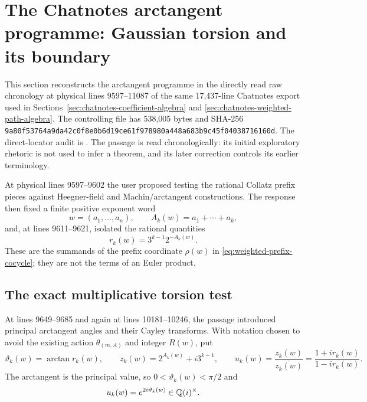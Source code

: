\section{The Chatnotes arctangent programme: Gaussian torsion and its boundary}
\label{sec:chatnotes-arctangent-torsion}

This section reconstructs the arctangent programme in the directly read raw
chronology at physical lines 9597--11087 of the same 17,437-line Chatnotes
export used in Sections~\ref{sec:chatnotes-coefficient-algebra} and
\ref{sec:chatnotes-weighted-path-algebra}.  The controlling file has 538,005
bytes and SHA-256
\nolinkurl{9a80f53764a9da42c0f8e0b6d19ce61f978980a448a683b9c45f04038716160d}.
The direct-locator audit is
.
The passage is read chronologically: its initial exploratory rhetoric is not
used to infer a theorem, and its later correction controls its earlier
terminology.

At physical lines 9597--9602 the user proposed testing the rational Collatz
prefix pieces against Heegner-field and Machin/arctangent constructions.  The
response then fixed a finite positive exponent word
\[
 w=(a_1,\ldots,a_n),\qquad
 A_k(w)=a_1+\cdots+a_k,
\]
and, at lines 9611--9621, isolated the rational quantities
\begin{equation}
\label{eq:chatnotes-arctangent-prefix-pieces}
 r_k(w)=3^{k-1}2^{-A_k(w)}.
\end{equation}
These are the summands of the prefix coordinate
\(\rho(w)\) in \eqref{eq:weighted-prefix-cocycle}; they are not the terms of
an Euler product.

\subsection{The exact multiplicative torsion test}

At lines 9649--9685 and again at lines 10181--10246, the passage introduced
principal arctangent angles and their Cayley transforms.  With notation chosen
to avoid the existing action \(\theta_{(m,A)}\) and integer \(R(w)\), put
\begin{equation}
\label{eq:chatnotes-arctangent-cayley-data}
 \vartheta_k(w)=\arctan r_k(w),\qquad
 z_k(w)=2^{A_k(w)}+i3^{k-1},\qquad
 u_k(w)=\frac{z_k(w)}{\overline{z_k(w)}}
       =\frac{1+i r_k(w)}{1-i r_k(w)}.
\end{equation}
The arctangent is the principal value, so
\(0<\vartheta_k(w)<\pi/2\) and
\begin{equation}
\label{eq:chatnotes-arctangent-cayley-exponential}
 u_k(w)=e^{2i\vartheta_k(w)}\in\mathbb{Q}(i)^\times.
\end{equation}

